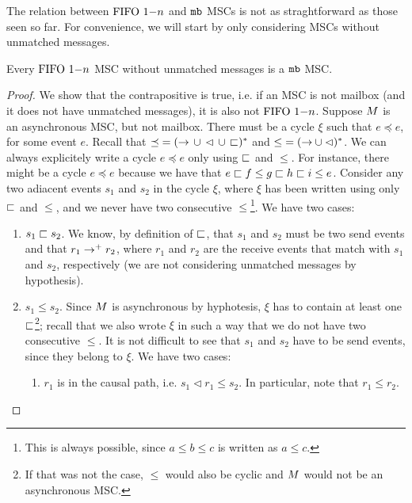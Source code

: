 The relation between $\text{FIFO } 1\mathsf{-}n$ and $\mathtt{mb}$ MSCs is not as straghtforward as those seen so far. For convenience, we will start by only considering MSCs without unmatched messages. 


\begin{proposition} \label{prop:onen_mb_no_unmatched}
	Every $\text{FIFO } 1\mathsf{-}n$ MSC without unmatched messages is a $\mathtt{mb}$ MSC.
\end{proposition}
\begin{proof}
We show that the contrapositive is true, i.e. if an MSC is not mailbox (and it does not have unmatched messages), it is also not $\text{FIFO } 1\mathsf{-}n$. Suppose $M$ is an asynchronous MSC, but not mailbox. There must be a cycle $\xi$ such that  $e \preceq e$, for some event $e$. Recall that ${\preceq} = ({\to} \,\cup\, {\lhd} \,\cup\, {\sqsubset})^\ast$ and ${\le} = ({\to} \cup {\lhd})^\ast$. We can always explicitely write a cycle $e \preceq e$ only using $\sqsubset$ and $\le$. For instance, there might be a cycle $e \preceq e$ because we have that $e \sqsubset f \le g \sqsubset h \sqsubset i \le e$. Consider any two adiacent events $s_1$ and $s_2$ in the cycle $\xi$, where $\xi$ has been written using only $\sqsubset$ and $\le$, and we never have two consecutive $\le$\footnote{This is always possible, since $a \le b \le c$ is written as $a \le c$.}. We have two cases:
\begin{enumerate}
	\item $s_1 \sqsubset s_2$. We know, by definition of $\sqsubset$, that $s_1$ and $s_2$ must be two send events and that $r_1 \to^+ r_2$, where $r_1$ and $r_2$ are the receive events that match with $s_1$ and $s_2$, respectively (we are not considering unmatched messages by hypothesis).
	\item $s_1 \le s_2$. Since $M$ is asynchronous by hyphotesis, $\xi$ has to contain at least one $\sqsubset$\footnote{If that was not the case, $\le$ would also be cyclic and $M$ would not be an asynchronous MSC.}; recall that we also wrote $\xi$ in such a way that we do not have two consecutive $\le$. It is not difficult to see that $s_1$ and $s_2$ have to be send events, since they belong to $\xi$. We have two cases:
	\begin{enumerate}
		\item $r_1$ is in the causal path, i.e. $s_1 \lhd r_1 \le s_2$. In particular, note that $r_1 \le r_2$.

\end{enumerate}
\end{enumerate}
\end{proof}
